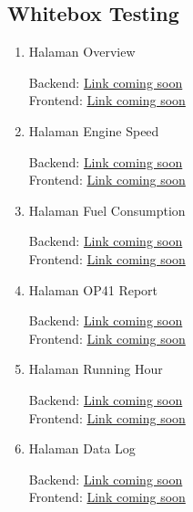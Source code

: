 \newpage

\subsection{Whitebox Testing}\label{apdx:whitebox}

\begin{enumerate}
    \item Halaman Overview

    Backend: \href{https://github.com}{Link coming soon} \\
    Frontend: \href{https://github.com}{Link coming soon}

    \item Halaman Engine Speed

    Backend: \href{https://github.com}{Link coming soon} \\
    Frontend: \href{https://github.com}{Link coming soon}

    \item Halaman Fuel Consumption

    Backend: \href{https://github.com}{Link coming soon} \\
    Frontend: \href{https://github.com}{Link coming soon}

    \item Halaman OP41 Report

    Backend: \href{https://github.com}{Link coming soon} \\
    Frontend: \href{https://github.com}{Link coming soon}

    \item Halaman Running Hour

    Backend: \href{https://github.com}{Link coming soon} \\
    Frontend: \href{https://github.com}{Link coming soon}

    \item Halaman Data Log

    Backend: \href{https://github.com}{Link coming soon} \\
    Frontend: \href{https://github.com}{Link coming soon}
\end{enumerate}


